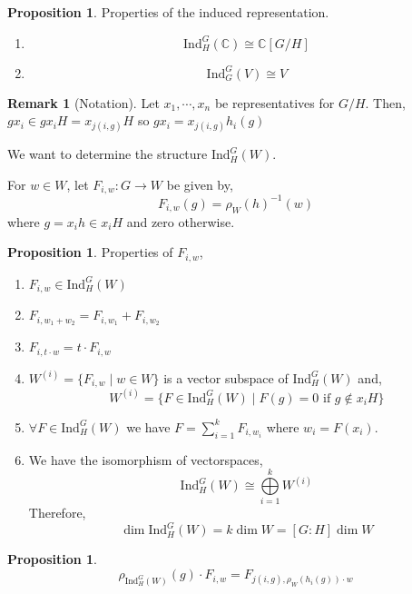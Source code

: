\documentclass[12pt]{extarticle}
\newcommand{\C}{\mathbb{C}}
\newcommand{\Ind}[3]{\mathrm{Ind}_{#2}^{#1}\left(#3\right)}
\theoremstyle{definition}
\newtheorem{proposition}[theorem]{Proposition}
\newtheorem{remark}{Remark}
\newenvironment{definition}[1][Definition:]{\begin{trivlist}
\item[\hskip \labelsep {\bfseries #1}]}{\end{trivlist}}
\begin{document}
\begin{proposition}
Properties of the induced representation. 
\begin{enumerate}
\item \[ \Ind{G}{H}{\C} \cong \C[G/H] \]

\item \[ \Ind{G}{G}{V} \cong V \]
\end{enumerate}
\end{proposition}

\begin{remark}[Notation]
Let $x_1, \cdots, x_n$ be representatives for $G/H$. Then, $g x_i \in g x_i H = x_{j(i,g)} H$ so $g x_i = x_{j(i,g)} h_i(g)$ 
\end{remark}

We want to determine the structure $\Ind{G}{H}{W}$.

\begin{definition}
For $w \in W$, let $F_{i, w} : G \to W$ be given by,
\[ F_{i, w} (g) = \rho_W(h)^{-1}(w)\]
where $g = x_i h \in x_i H$ and zero otherwise. 
\end{definition}

\begin{proposition}
Properties of $F_{i,w}$,
\begin{enumerate}
\item $F_{i, w} \in \Ind{G}{H}{W}$

\item $F_{i, w_1 + w_2} = F_{i, w_1} + F_{i, w_2}$

\item $F_{i, t \cdot w} = t \cdot F_{i, w}$

\item $W^{(i)} = \{F_{i, w} \mid w \in W\}$ is a vector subspace of $\Ind{G}{H}{W}$ and, 
\[W^{(i)} = \{ F \in \Ind{G}{H}{W} \mid F(g) = 0 \text{ if } g \notin x_i H \}\]

\item $\forall F \in \Ind{G}{H}{W}$ we have $F = \sum\limits_{i = 1}^k F_{i, w_i}$ where $w_i = F(x_i)$.

\item We have the isomorphism of vectorspaces,
\[\Ind{G}{H}{W} \cong \bigoplus\limits_{i = 1}^k W^{(i)}\]
Therefore, 
\[\dim{\Ind{G}{H}{W}} = k \dim{W} = [G : H] \dim{W}\]
\end{enumerate}
\end{proposition}

\begin{proposition}
\[ \rho_{\Ind{G}{H}{W}}(g) \cdot F_{i, w} = F_{j(i, g), \rho_W(h_i(g)) \cdot w} \]
\end{proposition}
\end{document}
